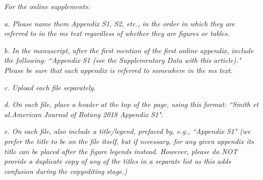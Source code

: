 \documentclass[10.95pt,a4paper]{letter}
\begin{document}
\par \emph{For the online supplements:}
\par \emph{a. Please name them Appendix S1, S2, etc., in the order in which they are referred to in the ms text regardless of whether they are figures or tables. } 
\par \emph{b. In the manuscript, after the first mention of the first online appendix, include the following: ``Appendix S1 (see the Supplementary Data with this article)." Please be sure that each appendix is referred to somewhere in the ms text.}
\par \emph{c. Upload each file separately.}  
\par \emph{d. On each file, place a header at the top of the page, using this format: ``Smith et al.American Journal of Botany 2018 Appendix S1"}.
\par \emph{e. On each file, also include a title/legend, prefaced by, e.g., ``Appendix S1" (we prefer the title to be on the file itself, but if necessary, for any given appendix its title can be placed after the figure legends instead. However, please do NOT provide a duplicate copy of any of the titles in a separate list as this adds confusion during the copyediting stage.)}
\end{document}

